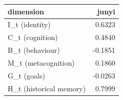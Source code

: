 \begin{tabular}{lr}
\toprule
dimension & junyi \\
\midrule
I\_t (identity) & 0.6323 \\
C\_t (cognition) & 0.4840 \\
B\_t (behaviour) & -0.1851 \\
M\_t (metacognition) & 0.1860 \\
G\_t (goals) & -0.0263 \\
H\_t (historical memory) & 0.7999 \\
\bottomrule
\end{tabular}
